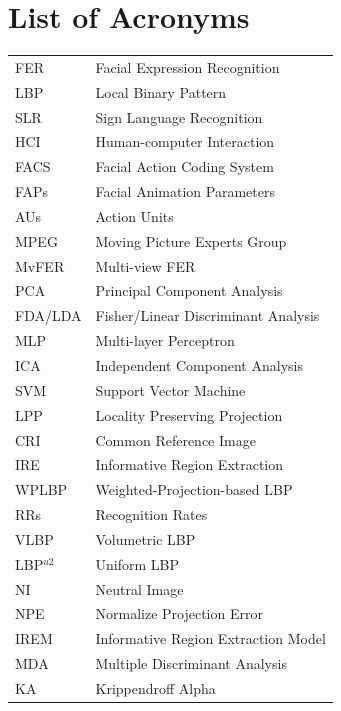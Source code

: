 \chapter*{List of Acronyms}



\begin{longtable}{ll}


FER             & Facial Expression Recognition  \\
LBP             & Local Binary Pattern \\
SLR             & Sign Language Recognition \\
HCI             & Human-computer Interaction \\
FACS            & Facial Action Coding System\\
FAPs             & Facial Animation Parameters\\
AUs             & Action Units\\
MPEG            & Moving Picture Experts Group\\
MvFER           & Multi-view FER \\
PCA             & Principal Component Analysis \\
FDA/LDA         & Fisher/Linear Discriminant Analysis \\
MLP             & Multi-layer Perceptron \\
ICA             & Independent Component Analysis \\
SVM             & Support Vector Machine \\
LPP             & Locality Preserving Projection \\
CRI             & Common Reference Image \\
IRE             & Informative Region Extraction \\
WPLBP           & Weighted-Projection-based LBP \\
RRs             & Recognition Rates \\
VLBP            & Volumetric LBP \\
LBP$^{u2}$      & Uniform LBP \\
NI              & Neutral Image \\
NPE             & Normalize Projection Error \\
IREM            & Informative Region Extraction Model \\
MDA             & Multiple Discriminant Analysis \\
KA              & Krippendroff Alpha \\

\end{longtable}
